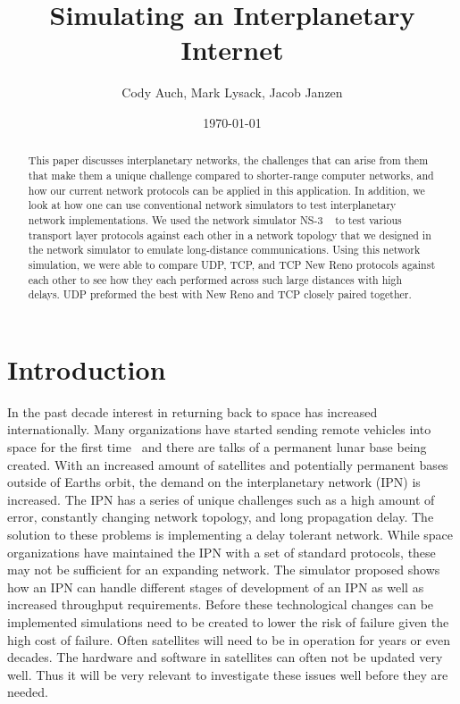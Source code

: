 \documentclass[a4paper,12pt]{article}
\title{Simulating an Interplanetary Internet}
\author{Cody Auch, Mark Lysack, Jacob Janzen}
\date{\today}
\begin{document}
\maketitle

\begin{abstract}
  This paper discusses interplanetary networks, the challenges that can arise
  from them that make them a unique challenge compared to shorter-range computer
  networks, and how our current network protocols can be applied in this application. In
  addition, we look at how one can use conventional network simulators to test
  interplanetary network implementations. We used the network simulator
  NS-3 ~\cite{ns-3} to test various transport layer protocols against each other
  in a network topology that we designed in the network simulator to emulate
  long-distance communications. Using this network simulation, we were able to
  compare UDP, TCP, and TCP New Reno protocols against each other to see how
  they each performed across such large distances with high delays. UDP preformed the 
  best with New Reno and TCP closely paired together.
\end{abstract}

\section{Introduction}

In the past decade interest in returning back to space has increased
internationally. Many organizations have started sending remote vehicles into
space for the first time~%
and there are talks of a permanent lunar base being created. With an increased
amount of satellites and potentially permanent bases outside of Earths orbit,
the demand on the interplanetary network (IPN) is increased. The IPN has a
series of unique challenges such as a high amount of error, constantly changing
network topology, and long propagation delay. The solution to these problems is
implementing a delay tolerant network. While space organizations have maintained
the IPN with a set of standard protocols, these may not be sufficient for an
expanding network. The simulator proposed shows how an IPN can handle different
stages of development of an IPN as well as increased throughput requirements.
Before these technological changes can be implemented simulations need to be
created to lower the risk of failure given the high cost of failure. Often
satellites will need to be in operation for years or even decades. The hardware
and software in satellites can often not be updated very well. Thus it will be
very relevant to investigate these issues well before they are needed.
\end{document}
